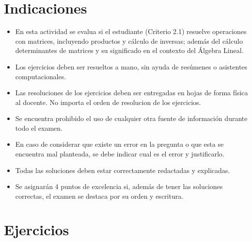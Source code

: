 \documentclass[11pt,respuestas,a4]{aleph-examen}
\begin{document}
\encabezado

\section*{Indicaciones}
\begin{itemize}[leftmargin=*]
\item
    En esta actividad se evalua si el estudiante (Criterio 2.1) resuelve operaciones con matrices, incluyendo productos y cálculo de inversas; además del cálculo determinantes de matrices y su significado en el contexto del Álgebra Lineal.
\item
    Los ejercicios deben ser resueltos a mano, sin ayuda de resúmenes o asistentes computacionales.
\item
    Las resoluciones de los ejercicios deben ser entregadas en hojas de forma física al docente. No importa el orden de resolucion de los ejercicios.
\item
    Se encuentra prohibido el uso de cualquier otra fuente de información durante todo el examen.
\item
    En caso de considerar que existe un error en la pregunta o que esta se encuentra mal planteada, se debe indicar cual es el error y justificarlo.
\item
    Todas las soluciones deben estar correctamente redactadas y explicadas.
\item
    Se asignarán 4 puntos de excelencia si, además de tener las soluciones correctas, el examen se destaca por su orden y escritura.
\end{itemize}

\section*{Ejercicios}
\end{document}
